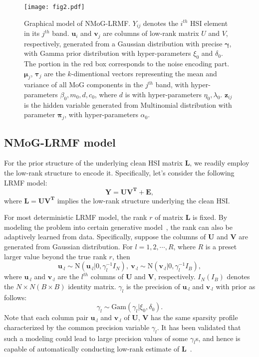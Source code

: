 \documentclass[journal]{IEEEtran}
\begin{document}
\begin{figure}[t]
	\centering
	\texttt{[image: fig2.pdf]}
\vspace{-2mm}
	\caption{Graphical model of NMoG-LRMF. $ Y_{ij} $ denotes the $ i^{th}$ HSI element in its $ j^{th} $ band. $ \bm{u}_{i} $ and $ \bm{v}_{j} $ are columns of low-rank matrix $ U $ and $ V $, respectively, generated from a Gaussian distribution with precise $ \bm{\gamma}$, with Gamma prior distribution with hyper-parameters $\xi_0 $ and $ \delta_0 $. The portion in the red box corresponds to the noise encoding part. $ \bm{\mu}_j $, $ \bm{\tau}_j $ are the $ k $-dimentional vectors representing the mean and variance of all MoG components in the $j^{th}$ band, with hyper-parameters $ \beta_0, m_0 ,d, c_0 $, where $d$ is with hyper-parameters $ \eta_0, \lambda_0 $. $ \bm{z}_{ij} $ is the hidden variable generated from Multinomial distribution with parameter $ \bm{\pi}_{j} $, with hyper-parameters $ \alpha_0 $.} \label{gm}
\end{figure}

\subsection{NMoG-LRMF model}
For the prior structure of the underlying clean HSI matrix $ \bm{L} $, we readily employ the low-rank structure to encode it. Specifically, let's consider the following LRMF model:
\begin{equation}
\bm{Y=UV^T+E},
\end{equation}
where $ \bm{L=UV^T} $ implies the low-rank structure underlying the clean HSI.


For most deterministic LRMF model, the rank $ r $ of matrix $ \bm{L} $ is fixed. By modeling the problem into certain generative model~\cite{babacan2012sparse,zhao2014robust}, the rank can also be adaptively learned from data. Specifically, suppose the columns of $ \bm{U} $ and $ \bm{V} $  are generated from Gaussian distribution. For $ l = 1,2,\cdots, R $, where $  R $ is a preset larger value beyond the true rank $ r $, then
\begin{equation}\label{u,v}
\bm{u}_{\cdot l} \sim \mathrm{N}(\bm{u}_{\cdot l}|0,\gamma_{l}^{-1}I_N),~
\bm{v}_{\cdot l} \sim \mathrm{N}(\bm{v}_{\cdot l}|0,\gamma_{l}^{-1}I_B),
\end{equation}
where $ \bm{u}_{\cdot l} $ and $  \bm{v}_{\cdot l} $ are the $ l^{th} $ columns of $ \bm{U} $ and $ \bm{V} $, respectively. $ I_N(I_B) $ denotes the $ N\times N (B\times B) $ identity matrix. $ \gamma_{l} $ is the precision of  $ \bm{u}_{\cdot l} $ and $ \bm{v}_{\cdot l} $ with prior as follows:
\begin{equation}\label{r}
\gamma_l\sim \mathrm{Gam}(\gamma_l|\xi_0,\delta_0).
\end{equation}
Note that each column pair $ \bm{u}_{\cdot l} $ and $  \bm{v}_{\cdot l} $ of $ \bm{U} $, $ \bm{V} $ has the same sparsity profile characterized by the common precision variable $ \gamma_l $. It has been validated that such a modeling could
lead to large precision values of some $\gamma_{l}$s, and hence is capable of automatically conducting low-rank estimate of $\bm{L}$~\cite{babacan2012sparse}.
\end{document}
